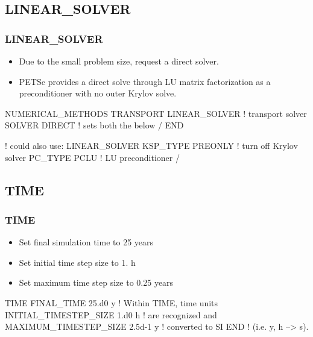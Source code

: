 \documentclass{beamer}
\newcommand\redcomment[1]{{{\color{red} #1}}}
\newcommand\bluecomment[1]{{{\color{blue} #1}}}
\newcommand\greencomment[1]{{{\color{green} #1}}}
\begin{document}
\subsection{LINEAR\_SOLVER}

\begin{frame}[fragile]\frametitle{LINEAR\_SOLVER}

\begin{itemize}
\item Due to the small problem size, request a direct solver.
\item PETSc provides a direct solve through LU matrix factorization as a preconditioner with no outer Krylov solve.
\end{itemize}

\begin{semiverbatim}

NUMERICAL_METHODS TRANSPORT
  LINEAR_SOLVER           \bluecomment{! transport solver}
    SOLVER DIRECT         \bluecomment{! sets both the below}
  /
END

  \bluecomment{! could also use:}
  LINEAR_SOLVER
    KSP_TYPE PREONLY        \bluecomment{! turn off Krylov solver}
    PC_TYPE PCLU            \bluecomment{! LU preconditioner}
  /

\end{semiverbatim}

\end{frame}

\subsection{TIME}

\begin{frame}[fragile]\frametitle{TIME}

\begin{itemize}
\item Set final simulation time to 25 years
\item Set initial time step size to 1. h
\item Set maximum time step size to 0.25 years
\end{itemize}


\begin{semiverbatim}

TIME
  FINAL_TIME 25.d0 \redcomment{y}            \bluecomment{! Within TIME, time units}
  INITIAL_TIMESTEP_SIZE 1.d0 \redcomment{h}    \bluecomment{! are recognized and}
  MAXIMUM_TIMESTEP_SIZE 2.5d-1 \redcomment{y}  \bluecomment{! converted to SI}
END                               \bluecomment{! (i.e. \redcomment{y}, \redcomment{h} --> \greencomment{s}).}
\end{semiverbatim}

\end{frame}
\end{document}
